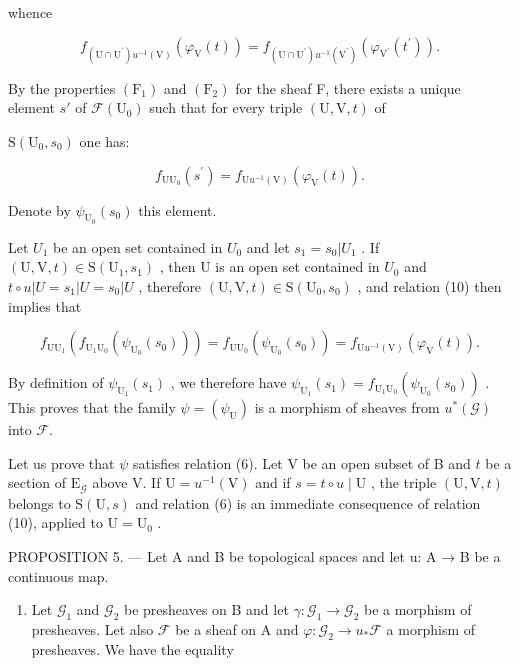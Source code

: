 whence

\[
f_{(\mathrm{U}\cap\mathrm{U}^{\prime})u^{-1}(\mathrm{V})}(\varphi_{\mathrm{V}}(t)) = f_{(\mathrm{U}\cap\mathrm{U}^{\prime})u^{-1}(\mathrm{V}^{\prime})}(\varphi_{\mathrm{V}^{\prime}}(t^{\prime})).\tag{9}
\]

By the properties \((\mathrm{F}_{1})\) and \((\mathrm{F}_{2})\) for the sheaf F, there exists a unique element \(s'\) of \(\mathcal{F}(\mathrm{U}_{0})\) such that for every triple \((\mathrm{U},\mathrm{V},t)\) of

\(\mathrm{S}(\mathrm{U}_{0},s_{0})\) one has:

\[
f_{\mathrm{U}\mathrm{U}_{0}}(s^{\prime}) = f_{\mathrm{U}u^{-1}(\mathrm{V})}(\varphi_{\mathrm{V}}(t)).\tag{10}
\]

Denote by \(\psi_{\mathrm{U}_{0}}(s_{0})\) this element.

Let \(U_{1}\) be an open set contained in \(U_{0}\) and let \(s_{1}=s_{0}|U_{1}\) . If \((\mathrm{U},\mathrm{V},t)\in\mathrm{S}(\mathrm{U}_{1},s_{1})\) , then U is an open set contained in \(U_{0}\) and \(t\circ u|U=s_{1}|U=s_{0}|U\) , therefore \((\mathrm{U},\mathrm{V},t)\in\mathrm{S}(\mathrm{U}_{0},s_{0})\) , and relation (10) then implies that

\[
f_{\mathrm{U}\mathrm{U}_{1}}(f_{\mathrm{U}_{1}\mathrm{U}_{0}}(\psi_{\mathrm{U}_{0}}(s_{0}))) = f_{\mathrm{U}\mathrm{U}_{0}}(\psi_{\mathrm{U}_{0}}(s_{0})) = f_{\mathrm{U}u^{-1}(\mathrm{V})}(\varphi_{\mathrm{V}}(t)).
\]

By definition of \(\psi_{\mathrm{U}_{1}}(s_{1})\) , we therefore have \(\psi_{\mathrm{U}_{1}}(s_{1}) = f_{\mathrm{U}_{1}\mathrm{U}_{0}}(\psi_{\mathrm{U}_{0}}(s_{0}))\) . This proves that the family \(\psi = (\psi_{\mathrm{U}})\) is a morphism of sheaves from \(u^{*}(\mathcal{G})\) into \(\mathcal{F}\).

Let us prove that \(\psi\) satisfies relation (6). Let V be an open subset of B and \(t\) be a section of \(\mathrm{E}_{\mathcal{G}}\) above V. If \(\mathrm{U} = u^{-1}(\mathrm{V})\) and if \(s = t \circ u \mid \mathrm{U}\) , the triple \((\mathrm{U}, \mathrm{V}, t)\) belongs to \(\mathrm{S}(\mathrm{U}, s)\) and relation (6) is an immediate consequence of relation (10), applied to \(\mathrm{U} = \mathrm{U}_0\) .

PROPOSITION 5. — Let A and B be topological spaces and let u: A → B be a continuous map.

\begin{enumerate}
\def\labelenumi{\alph{enumi})}
\tightlist
\item
  Let \(\mathcal{G}_1\) and \(\mathcal{G}_2\) be presheaves on B and let \(\gamma\colon\mathcal{G}_1\to\mathcal{G}_2\) be a morphism of presheaves. Let also \(\mathcal{F}\) be a sheaf on A and \(\varphi\colon\mathcal{G}_2\to u_*\mathcal{F}\) a morphism of presheaves. We have the equality
\end{enumerate}

